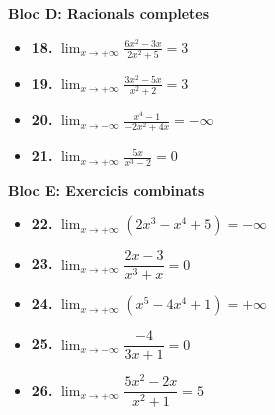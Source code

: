 \documentclass[12pt,a4paper]{article}
\begin{document}
\textbf{Bloc D: Racionals completes}
\begin{itemize}
    \item \textbf{18.} $\lim_{x \to +\infty} \frac{6x^2 - 3x}{2x^2 + 5} = 3$
    \item \textbf{19.} $\lim_{x \to +\infty} \frac{3x^2 - 5x}{x^2 + 2} = 3$
    \item \textbf{20.} $\lim_{x \to -\infty} \frac{x^4 - 1}{-2x^2 + 4x} = -\infty$
    \item \textbf{21.} $\lim_{x \to +\infty} \frac{5x}{x^3 - 2} = 0$
\end{itemize}

\textbf{Bloc E: Exercicis combinats}
\begin{itemize}
    \item \textbf{22.} $\lim_{x \to +\infty} (2x^3 - x^4 + 5) = -\infty$
    \item \textbf{23.} $\lim_{x \to +\infty} \dfrac{2x - 3}{x^3 + x} = 0$
    \item \textbf{24.} $\lim_{x \to +\infty} (x^5 - 4x^4 + 1) = +\infty$
    \item \textbf{25.} $\lim_{x \to -\infty} \dfrac{-4}{3x + 1} = 0$
    \item \textbf{26.} $\lim_{x \to +\infty} \dfrac{5x^2 - 2x}{x^2 + 1} = 5$
\end{itemize}
\end{document}

